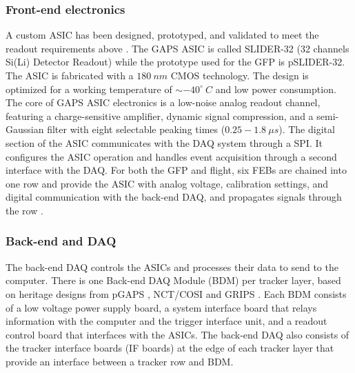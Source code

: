 \subsubsection*{Front-end electronics}
A custom ASIC has been designed, prototyped, and validated to meet the readout requirements above \cite{9564082}. The \ac{GAPS} ASIC is called SLIDER-32 (32 channels \ac{Si(Li)} Detector Readout) while the prototype used for the \ac{GFP} is pSLIDER-32. The ASIC is fabricated with a $ 180~nm $ CMOS technology. The design is optimized for a working temperature of $\sim-40^\circ~C $ and low power consumption. The core of \ac{GAPS} ASIC electronics is a low-noise analog readout channel, featuring a charge-sensitive amplifier, dynamic signal compression, and a semi-Gaussian filter with eight selectable peaking times ($ 0.25-1.8~\mu s$). The digital section of the ASIC communicates with the DAQ system through a \ac{SPI}. It configures the ASIC operation and handles event acquisition through a second interface with the DAQ. For both the \ac{GFP} and flight, six FEBs are chained into one row and provide the ASIC with analog voltage, calibration settings, and digital communication with the back-end DAQ, and propagates signals through the row \cite{RE2023167617}.

\subsubsection*{Back-end and DAQ}
The back-end DAQ controls the ASICs and processes their data to send to the computer. There is one Back-end DAQ Module (BDM) per tracker layer, based on heritage designs from pGAPS \cite{MOGNET201424, VONDOETINCHEM201493}, NCT/COSI \cite{tomsick2019comptonspectrometerimager} and GRIPS \cite{Jochen_Greiner_2012}. Each BDM consists of a low voltage power supply board, a system interface board that relays information with the computer and the trigger interface unit, and a readout control board that interfaces with the ASICs. The back-end DAQ also consists of the tracker interface boards (IF boards) at the edge of each tracker layer that provide an interface between a tracker row and BDM.

